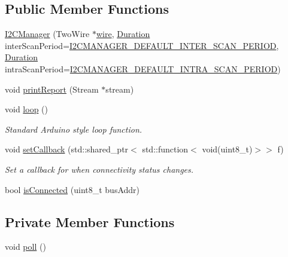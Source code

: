 \subsection*{Public Member Functions}
\begin{DoxyCompactItemize}
\item 
\mbox{\hyperlink{class_i2_c_manager_a2d806ad3a65969077b436f0d3a9a70f2}{I2\+C\+Manager}} (Two\+Wire $\ast$\mbox{\hyperlink{main_8cpp_ab8d8f9af97a698a5a73132c347acbaf4}{wire}}, \mbox{\hyperlink{_scheduler_8h_aca1fa1a7edde6bf9e22c7617400fad31}{Duration}} inter\+Scan\+Period=\mbox{\hyperlink{_i2_c_manager_8h_a5aa8afc0ad4792d13a6cb089c9d50537}{I2\+C\+M\+A\+N\+A\+G\+E\+R\+\_\+\+D\+E\+F\+A\+U\+L\+T\+\_\+\+I\+N\+T\+E\+R\+\_\+\+S\+C\+A\+N\+\_\+\+P\+E\+R\+I\+OD}}, \mbox{\hyperlink{_scheduler_8h_aca1fa1a7edde6bf9e22c7617400fad31}{Duration}} intra\+Scan\+Period=\mbox{\hyperlink{_i2_c_manager_8h_a9b3d76aae3ebcca37db7e5d8cae3053e}{I2\+C\+M\+A\+N\+A\+G\+E\+R\+\_\+\+D\+E\+F\+A\+U\+L\+T\+\_\+\+I\+N\+T\+R\+A\+\_\+\+S\+C\+A\+N\+\_\+\+P\+E\+R\+I\+OD}})
\item 
void \mbox{\hyperlink{class_i2_c_manager_a0fcbab8677f2abcd3febe6b809f8f062}{print\+Report}} (Stream $\ast$stream)
\item 
void \mbox{\hyperlink{class_i2_c_manager_aa7cce07ffa6d2e5e7eb0ac9d5d237d69}{loop}} ()
\begin{DoxyCompactList}\small\item\em Standard Arduino style {\ttfamily loop} function. \end{DoxyCompactList}\item 
void \mbox{\hyperlink{class_i2_c_manager_a1e027a9de421a28a606dedd366858bd8}{set\+Callback}} (std\+::shared\+\_\+ptr$<$ std\+::function$<$ void(uint8\+\_\+t)$>$$>$ f)
\begin{DoxyCompactList}\small\item\em Set a callback for when connectivity status changes. \end{DoxyCompactList}\item 
bool \mbox{\hyperlink{class_i2_c_manager_a5d82cb322527d9ebea41277899fe7558}{is\+Connected}} (uint8\+\_\+t bus\+Addr)
\end{DoxyCompactItemize}
\subsection*{Private Member Functions}
\begin{DoxyCompactItemize}
\item 
void \mbox{\hyperlink{class_i2_c_manager_a54a85fded61d8faab6428e1fc1c90c8f}{poll}} ()
\end{DoxyCompactItemize}
